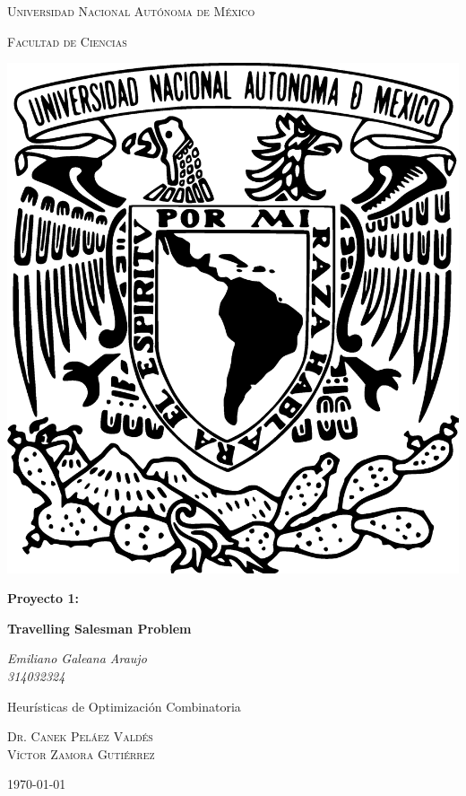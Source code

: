 \documentclass[12pt,a4paper]{article}
\begin{document}
\begin{titlepage}
  \centering
      {\scshape\LARGE Universidad Nacional Autónoma de México \par}
      \vspace{1cm}
	     {\scshape\Large Facultad de Ciencias\par}
	     \vspace{1.2cm}
             \begin{center}
	       \includegraphics[scale=.2]{./imagenes/UNAM.eps}
	     \end{center}
	     \vspace{.5 cm}

	     {\huge\bfseries Proyecto 1: \par}
	     {\huge\bfseries Travelling Salesman Problem\par}
	     \vspace{0.5cm}

	     {\Large\itshape Emiliano Galeana Araujo\\314032324\par}
	     \vfill
	     \vspace{0.5cm}

             Heurísticas de Optimización Combinatoria\par
	     \textsc{Dr. Canek Peláez Valdés}\\
             \textsc{Víctor Zamora Gutiérrez}\\
	     \vspace{0.1cm}
	            {\large \today \par}
\end{titlepage}
\end{document}
